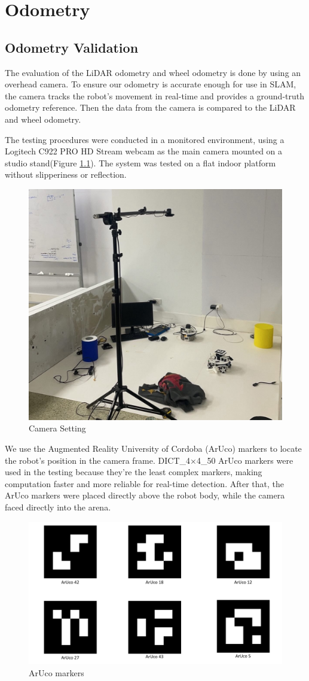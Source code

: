 \chapter{Odometry}

\section*{Odometry Validation}
The evaluation of the LiDAR odometry and wheel odometry is done by using an overhead camera. To ensure our odometry is accurate enough for use in SLAM, the camera tracks the robot’s movement in real-time and provides a ground-truth odometry reference. Then the data from the camera is compared to the LiDAR and wheel odometry.

The testing procedures were conducted in a monitored environment, using a Logitech C922 PRO HD Stream webcam as the main camera mounted on a studio stand(Figure \ref{fig:camera-setting}). The system was tested on a flat indoor platform without slipperiness or reflection. 

\begin{figure}[H]
    \centering
    \includegraphics[width=0.3\linewidth]{assets/images/odometry/cam_setting.jpg}
    \caption{Camera Setting}
    \label{fig:camera-setting}
\end{figure}

We use the Augmented Reality University of Cordoba (ArUco) markers to locate the robot's position in the camera frame. DICT\_4×4\_50 ArUco markers were used in the testing because they're the least complex markers, making computation faster and more reliable for real-time detection. After that, the ArUco markers were placed directly above the robot body, while the camera faced directly into the arena.

\begin{figure}[H]
    \centering
    \includegraphics[width=0.4\linewidth]{assets/images/odometry/aruco.png}
    \caption{ArUco markers}
    \label{fig:aruco}
\end{figure}

